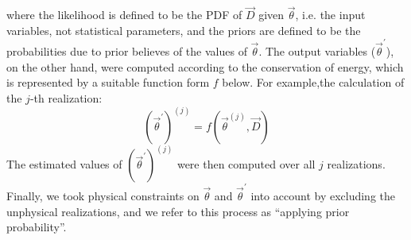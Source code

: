 where the likelihood is defined to be the PDF of $\vec{D}$ given $\vec{\theta}$,
i.e. the input variables, not statistical parameters, and the priors are
defined to be the probabilities due to prior believes of the values of
$\vec{\theta}$. The output variables ($\vec{\theta}^\prime$), on the other
hand, were computed according to the conservation of energy, which is represented by a suitable
function form $f$ below. For example,the calculation of the $j$-th realization: 
\begin{equation}
    (\vec{\theta}^\prime)^{(j)} = f(\vec{\theta}^{(j)}, \vec{D}) 
\end{equation}    
The estimated values of $(\vec{\theta}^\prime)^{(j)}$ were then computed
over all $j$ realizations. Finally, we took physical
constraints on $\vec{\theta}$ and $\vec{\theta}^\prime$ into account by
excluding the unphysical realizations, and we refer to this process as
``applying prior probability''. 

